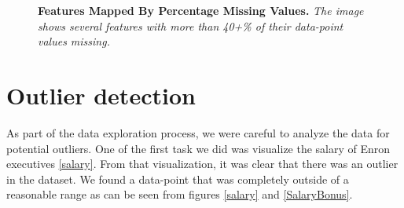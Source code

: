 \documentclass[twoside,openright,titlepage,numbers=noenddot,headinclude,%
               footinclude=true,cleardoublepage=empty,abstractoff,BCOR=5mm,%
               paper=a4,fontsize=11pt,ngerman,american]{scrreprt}
\numberwithin{theorem}{chapter}
\numberwithin{definition}{chapter}
\numberwithin{algorithm}{chapter}
\numberwithin{figure}{chapter}
\numberwithin{table}{chapter}
\numberwithin{equation}{chapter}
\begin{document}
\begin{figure}[!hbtp]
\centering
    
    \caption{\textbf{Features Mapped By Percentage Missing Values. }\textit{The image shows several features with more than 40+\% of their data-point values missing.}}
\end{figure}



\clearpage

\section*{Outlier detection}
 As part of the data exploration process, we were careful to analyze the data for potential outliers. One of the first task we did was visualize the salary of Enron executives \ref{salary}. From that visualization, it was clear that there was an outlier in the dataset. We found a data-point that was completely outside of a reasonable range as can be seen from figures \ref{salary} and \ref{SalaryBonus}. 
\end{document}
